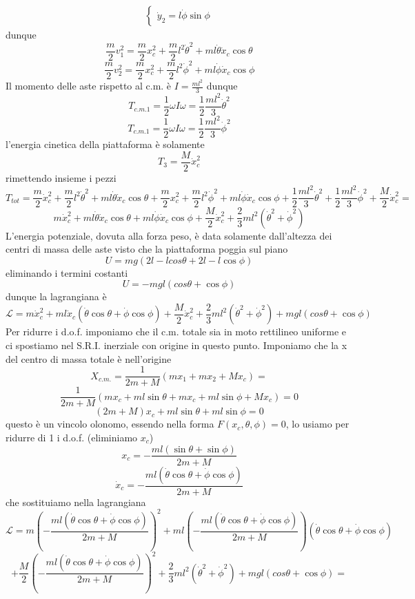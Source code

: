 \documentclass[
10pt, %
a4paper, %
oneside, %
headinclude,footinclude, %
BCOR5mm, %
]{scrartcl}
\begin{document}
\begin{esercizio}
\begin{align*}
\begin{cases}
		\dot{y}_2 = l\dot{\phi}\sin\phi
	\end{cases}
\end{align*}
	dunque
	\[\frac{m}{2}v_1^2 = \frac{m}{2}x_c^2+\frac{m}{2}l^2\dot{\theta}^2+ml\dot{\theta}\dot{x}_c\cos\theta\]
	\[\frac{m}{2}v_2^2 = \frac{m}{2}x_c^2+\frac{m}{2}l^2\dot{\phi}^2+ml\dot{\phi}\dot{x}_c\cos\phi\]
	Il momento delle aste rispetto al c.m. è \(I = \frac{ml^2}{3}\) dunque
	\[T_{c.m.1} = \frac{1}{2}\omega I\omega=\frac{1}{2}\frac{ml^2}{3}\dot{\theta}^2\]
	\[T_{c.m.1} = \frac{1}{2}\omega I\omega=\frac{1}{2}\frac{ml^2}{3}\dot{\phi}^2\]
	l'energia cinetica della piattaforma è solamente
	\[T_3 = \frac{M}{2}\dot{x}_c^2\]
	rimettendo insieme i pezzi
	\[T_{tot} =  \frac{m}{2}\dot{x}_c^2+\frac{m}{2}l^2\dot{\theta}^2+ml\dot{\theta}\dot{x}_c\cos\theta+\frac{m}{2}x_c^2+\frac{m}{2}l^2\dot{\phi}^2+ml\dot{\phi}\dot{x}_c\cos\phi+\frac{1}{2}\frac{ml^2}{3}\dot{\theta}^2+\frac{1}{2}\frac{ml^2}{3}\dot{\phi}^2+\frac{M}{2}\dot{x}_c^2 = \]
	\[{m}\dot{x}_c^2+ml\dot{\theta}\dot{x}_c\cos\theta+ml\dot{\phi}\dot{x}_c\cos\phi+\frac{M}{2}\dot{x}_c^2 + \frac{2}{3}ml^2(\dot{\theta}^2+\dot{\phi}^2)\]
	L'energia potenziale, dovuta alla forza peso, è data solamente dall'altezza dei centri di massa delle aste visto che la piattaforma poggia sul piano
	\[U = mg(2l-lcos\theta+2l-l\cos\phi) \]
	eliminando i termini costanti
	\[U = -mgl(cos\theta+\cos\phi)\]
	dunque la lagrangiana è
	\[\mathcal{L} = {m}\dot{x}_c^2+ml\dot{x}_c(\dot{\theta}\cos\theta+\dot{\phi}\cos\phi)+\frac{M}{2}\dot{x}_c^2 + \frac{2}{3}ml^2(\dot{\theta}^2+\dot{\phi}^2) + mgl(cos\theta+\cos\phi)\]
	Per ridurre i d.o.f. imponiamo che il c.m. totale sia in moto rettilineo uniforme e ci spostiamo nel S.R.I. inerziale con origine in questo punto. Imponiamo che la x del centro di massa totale è nell'origine
	\[X_{c.m.} = \frac{1}{2m + M} (mx_1 + mx_2 + Mx_c)= \]
	\[\frac{1}{2m + M} (mx_c+ ml\sin\theta + mx_c +ml\sin\phi + Mx_c) =  0\]
	\[(2m+M) x_c+ ml\sin\theta +ml\sin\phi = 0\]
	questo è un vincolo olonomo, essendo nella forma \(F(x_c, \theta, \phi) = 0\), lo usiamo per ridurre di 1 i d.o.f. (eliminiamo \(x_c\))
	\[x_c = -\frac{ml(\sin\theta+\sin\phi)}{2m + M}\]
	\[\dot{x}_c = -\frac{ml(\dot{\theta}\cos\theta+\dot{\phi}\cos\phi)}{2m + M}\]
	che sostituiamo nella lagrangiana
	\[\mathcal{L} = {m}\left(-\frac{ml(\dot{\theta}\cos\theta+\dot{\phi}\cos\phi)}{2m + M}\right)^2+ml\left(-\frac{ml(\dot{\theta}\cos\theta+\dot{\phi}\cos\phi)}{2m + M}\right)(\dot{\theta}\cos\theta+\dot{\phi}\cos\phi)\]
	\[+\frac{M}{2}\left(-\frac{ml(\dot{\theta}\cos\theta+\dot{\phi}\cos\phi)}{2m + M}\right)^2 + \frac{2}{3}ml^2(\dot{\theta}^2+\dot{\phi}^2) + mgl(cos\theta+\cos\phi) = \]

\end{esercizio}
\end{document}
